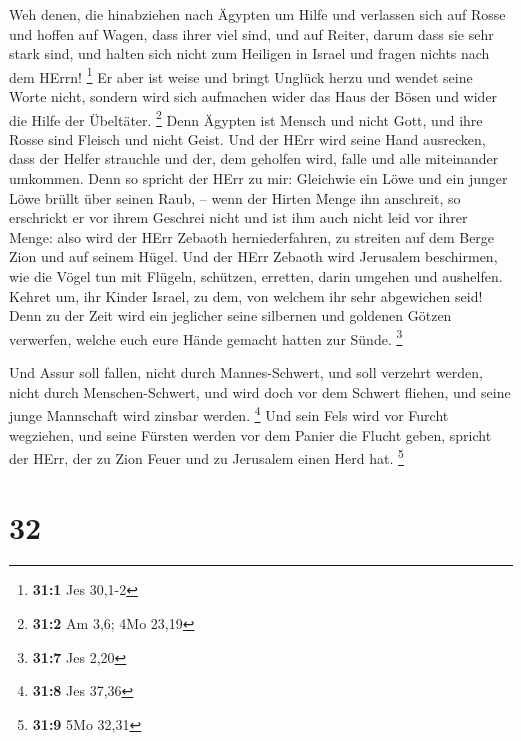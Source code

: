  Weh denen, die hinabziehen nach Ägypten um Hilfe und
verlassen sich auf Rosse und hoffen auf Wagen, dass ihrer viel sind, und
auf Reiter, darum dass sie sehr stark sind, und halten sich nicht zum
Heiligen in Israel und fragen nichts nach dem HErrn! \footnote{\textbf{31:1}
  Jes 30,1-2}  Er aber ist weise und bringt Unglück herzu
und wendet seine Worte nicht, sondern wird sich aufmachen wider das Haus
der Bösen und wider die Hilfe der Übeltäter. \footnote{\textbf{31:2} Am
  3,6; 4Mo 23,19}  Denn Ägypten ist Mensch und nicht Gott,
und ihre Rosse sind Fleisch und nicht Geist. Und der HErr wird seine
Hand ausrecken, dass der Helfer strauchle und der, dem geholfen wird,
falle und alle miteinander umkommen.  Denn so spricht der
HErr zu mir: Gleichwie ein Löwe und ein junger Löwe brüllt über seinen
Raub, -- wenn der Hirten Menge ihn anschreit, so erschrickt er vor ihrem
Geschrei nicht und ist ihm auch nicht leid vor ihrer Menge: also wird
der HErr Zebaoth herniederfahren, zu streiten auf dem Berge Zion und auf
seinem Hügel.  Und der HErr Zebaoth wird Jerusalem
beschirmen, wie die Vögel tun mit Flügeln, schützen, erretten, darin
umgehen und aushelfen.  Kehret um, ihr Kinder Israel, zu
dem, von welchem ihr sehr abgewichen seid!  Denn zu der Zeit
wird ein jeglicher seine silbernen und goldenen Götzen verwerfen, welche
euch eure Hände gemacht hatten zur Sünde. \footnote{\textbf{31:7} Jes
  2,20}

 Und Assur soll fallen, nicht durch Mannes-Schwert, und soll
verzehrt werden, nicht durch Menschen-Schwert, und wird doch vor dem
Schwert fliehen, und seine junge Mannschaft wird zinsbar werden.
\footnote{\textbf{31:8} Jes 37,36}  Und sein Fels wird vor
Furcht wegziehen, und seine Fürsten werden vor dem Panier die Flucht
geben, spricht der HErr, der zu Zion Feuer und zu Jerusalem einen Herd
hat. \footnote{\textbf{31:9} 5Mo 32,31}

\hypertarget{section-13}{%
\section{32}\label{section-13}}

